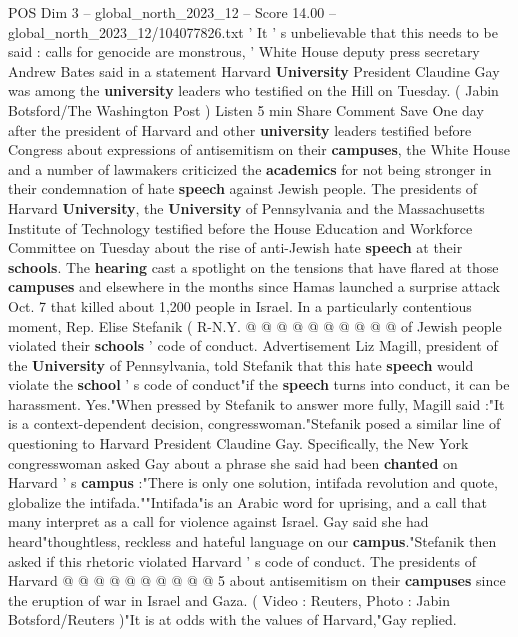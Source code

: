 \begin{textsample}{POS Dim 3 – global\_north\_2023\_12 – Score 14.00 – global\_north\_2023\_12/104077826.txt}  \label{ex:f3_pos_264}
' It ' s unbelievable that this needs to be said : calls for genocide are monstrous, ' White House deputy press secretary Andrew Bates said in a statement Harvard \textbf{University} President Claudine Gay was among the \textbf{university} leaders who testified on the Hill on Tuesday. ( Jabin Botsford/The Washington Post ) Listen 5 min Share Comment Save One day after the president of Harvard and other \textbf{university} leaders testified before Congress about expressions of antisemitism on their \textbf{campuses}, the White House and a number of lawmakers criticized the \textbf{academics} for not being stronger in their condemnation of hate \textbf{speech} against Jewish people.
The presidents of Harvard \textbf{University}, the \textbf{University} of Pennsylvania and the Massachusetts Institute of Technology testified before the House Education and Workforce Committee on Tuesday about the rise of anti-Jewish hate \textbf{speech} at their \textbf{schools}.
The \textbf{hearing} cast a spotlight on the tensions that have flared at those \textbf{campuses} and elsewhere in the months since Hamas launched a surprise attack Oct. 7 that killed about 1,200 people in Israel.
In a particularly contentious moment, Rep.
Elise Stefanik ( R-N.Y. @ @ @ @ @ @ @ @ @ @ of Jewish people violated their \textbf{schools} ' code of conduct.
Advertisement Liz Magill, president of the \textbf{University} of Pennsylvania, told Stefanik that this hate \textbf{speech} would violate the \textbf{school} ' s code of conduct"if the \textbf{speech} turns into conduct, it can be harassment.
Yes."When pressed by Stefanik to answer more fully, Magill said :"It is a context-dependent decision, congresswoman."Stefanik posed a similar line of questioning to Harvard President Claudine Gay.
Specifically, the New York congresswoman asked Gay about a phrase she said had been \textbf{chanted} on Harvard ' s \textbf{campus} :"There is only one solution, intifada revolution and quote, globalize the intifada.""Intifada"is an Arabic word for uprising, and a call that many interpret as a call for violence against Israel.
Gay said she had heard"thoughtless, reckless and hateful language on our \textbf{campus}."Stefanik then asked if this rhetoric violated Harvard ' s code of conduct.
The presidents of Harvard @ @ @ @ @ @ @ @ @ @ 5 about antisemitism on their \textbf{campuses} since the eruption of war in Israel and Gaza. ( Video : Reuters, Photo : Jabin Botsford/Reuters )"It is at odds with the values of Harvard,"Gay replied.

\end{textsample}
